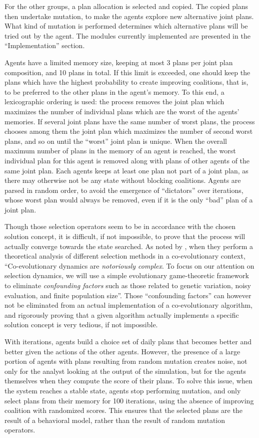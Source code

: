 {For the other groups, a plan allocation is selected and copied. The
copied plans then undertake mutation, to make the agents explore new
alternative joint plans. What kind of mutation is performed determines
which alternative plans will be tried out by the agent. The modules
currently implemented are presented in the ``Implementation'' section.

Agents have a limited memory size, keeping at most 3 plans per joint
plan composition, and 10 plans in total. If this limit is exceeded, one
should keep the plans which have the highest probability to create
improving coalitions, that is, to be preferred to the other plans in the
agent's memory. To this end, a lexicographic ordering is used: the
process removes the joint plan which maximizes the number of individual
plans which are the worst of the agents' memories. If several joint
plans have the same number of worst plans, the process chooses among
them the joint plan which maximizes the number of second worst plans,
and so on until the ``worst'' joint plan is unique. When the overall
maximum number of plans in the memory of an agent is reached, the worst
individual plan for this agent is removed along with plans of other
agents of the same joint plan. Each agents keeps at least one plan not
part of a joint plan, as there may otherwise not be any state without
blocking coalitions. Agents are parsed in random order, to avoid the
emergence of ``dictators'' over iterations, whose worst plan would
always be removed, even if it is the only ``bad'' plan of a joint plan.

Though those selection operators seem to be in accordance with the
chosen solution concept, it is difficult, if not impossible, to prove
that the process will actually converge towards the state searched. As
noted by \cite{FiciciEtAl_ITEC_2005}, when they perform a theoretical
analysis of different selection methods in a co-evolutionary context,
``Co-evolutionary dynamics are \emph{notoriously complex}. To focus on
our attention on selection dynamics, we will use a simple evolutionary
game-theoretic framework to eliminate \emph{confounding factors} such as
those related to genetic variation, noisy evaluation, and finite
population size''. Those ``confounding factors'' can however not be
eliminated from an actual implementation of a co-evolutionary algorithm,
and rigorously proving that a given algorithm actually implements a
specific solution concept is very tedious, if not impossible.

With iterations, agents build a choice set of daily plans that becomes
better and better given the actions of the other agents. However, the
presence of a large portion of agents with plans resulting from random
mutation creates noise, not only for the analyst looking at the output
of the simulation, but for the agents themselves when they compute the
score of their plans. To solve this issue, when the system reaches a
stable state, agents stop performing mutation, and only select plans
from their memory for 100 iterations, using the absence of improving
coalition with randomized scores. This ensures that the selected plans
are the result of a behavioral model, rather than the result of random
mutation operators.

}
